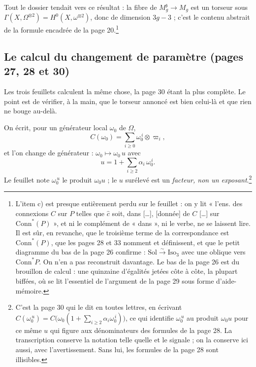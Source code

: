 \documentclass[11pt,a4paper]{article}
\begin{document}
Tout le dossier tendait vers ce résultat : la fibre de
$M_g^{\mathfrak{z}} \to M_g$ est un torseur sous
$\Gamma(X, \Omega^{\otimes 2}) = H^0(X, \omega^{\otimes 2})$, donc de
dimension $3g-3$ ; c'est le contenu abstrait de la formule encadrée de la
page 20.\footnote{L'item c) est presque entièrement perdu sur le feuillet :
on y lit « l'ens. des connexions $C$ sur $P$ telles que $\widehat{c}$ soit,
dans [\ldots], [donnée] de $C$ [\ldots] sur $\mathrm{Conn}^*(P)$ », et ni le
complément de « dans », ni le verbe, ne se laissent lire. Il est sûr, en revanche,
que le troisième terme de la correspondance est $\mathrm{Conn}^*(P)$, que les
pages 28 et 33 nomment et définissent, et que le petit diagramme du bas de la
page 26 confirme : $\mathrm{Sol} \xrightarrow{\sim} \mathrm{Iso}_3$ avec une
oblique vers $\mathrm{Conn}^*P$. On n'en a pas reconstruit davantage. Le bas
de la page 26 est du brouillon de calcul : une quinzaine d'égalités jetées
côte à côte, la plupart biffées, où se lit l'essentiel de l'argument de la
page 29 sous forme d'aide-mémoire.}

\subsection*{Le calcul du changement de paramètre (pages 27, 28 et 30)}

Les trois feuillets calculent la même chose, la page 30 étant la plus
complète. Le point est de vérifier, à la main, que le torseur annoncé est bien
celui-là et que rien ne bouge au-delà.

On écrit, pour un générateur local $\omega_0$ de $\Omega$,
\[
  C(\omega_0) = \sum_{i \geqslant 0} \omega_0^{\,i} \otimes \varpi_i,
\]
et l'on change de générateur : $\omega_0 \mapsto \omega_0\,u$ avec
\[
  u = 1 + \sum_{i \geqslant 2} \alpha_i\, \omega_0^{\,i} .
\]
Le feuillet note $\omega_0^{\,u}$ le produit $\omega_0 u$ ; le $u$ surélevé
est un \emph{facteur, non un exposant}.\footnote{C'est la page 30 qui le dit
en toutes lettres, en écrivant
$C(\omega_0^{\,u}) = C\big(\omega_0(1 + \sum_{i\geqslant 2}
\alpha_i\omega_0^{\,i})\big)$, ce qui identifie $\omega_0^{\,u}$ au produit
$\omega_0 u$ pour ce même $u$ qui figure aux dénominateurs des formules de la
page 28. La transcription conserve la notation telle quelle et le signale ;
on la conserve ici aussi, avec l'avertissement. Sans lui, les formules de la
page 28 sont illisibles.}
\end{document}
